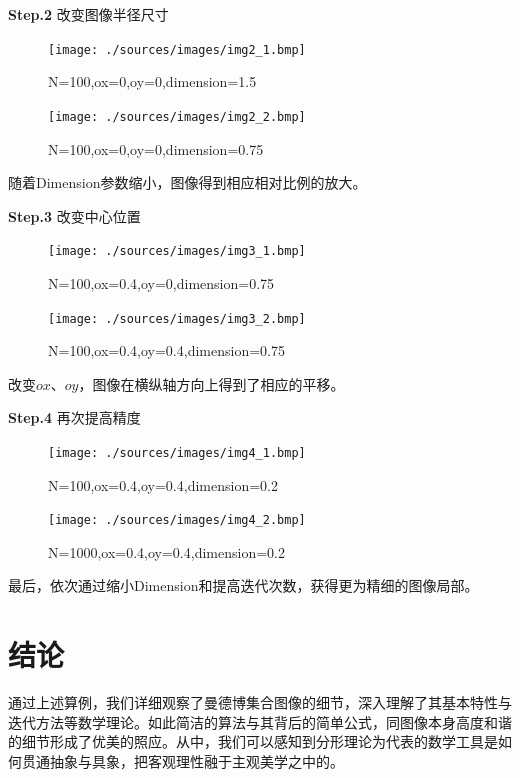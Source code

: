 \documentclass{ctexart}
\begin{document}
\textbf{Step.2} 改变图像半径尺寸

\begin{figure}[htb]
\centering
\begin{minipage}{0.48\linewidth}
\centering
\texttt{[image: ./sources/images/img2\_1.bmp]}
\caption{N=100,ox=0,oy=0,dimension=1.5}
\end{minipage}\hfill
\begin{minipage}{0.48\linewidth}
\centering
\texttt{[image: ./sources/images/img2\_2.bmp]}
\caption{N=100,ox=0,oy=0,dimension=0.75}
\end{minipage}
\end{figure}

随着Dimension参数缩小，图像得到相应相对比例的放大。

\textbf{Step.3} 改变中心位置

\begin{figure}[htb]
\centering
\begin{minipage}{0.48\linewidth}
\centering
\texttt{[image: ./sources/images/img3\_1.bmp]}
\caption{N=100,ox=0.4,oy=0,dimension=0.75}
\end{minipage}\hfill
\begin{minipage}{0.48\linewidth}
\centering
\texttt{[image: ./sources/images/img3\_2.bmp]}
\caption{N=100,ox=0.4,oy=0.4,dimension=0.75}
\end{minipage}
\end{figure}

改变$ox$、$oy$，图像在横纵轴方向上得到了相应的平移。

\textbf{Step.4} 再次提高精度

\begin{figure}[htb]
\centering
\begin{minipage}{0.48\linewidth}
\centering
\texttt{[image: ./sources/images/img4\_1.bmp]}
\caption{N=100,ox=0.4,oy=0.4,dimension=0.2}
\end{minipage}\hfill
\begin{minipage}{0.48\linewidth}
\centering
\texttt{[image: ./sources/images/img4\_2.bmp]}
\caption{N=1000,ox=0.4,oy=0.4,dimension=0.2}
\end{minipage}
\end{figure}

最后，依次通过缩小Dimension和提高迭代次数，获得更为精细的图像局部。

\section{结论}

通过上述算例，我们详细观察了曼德博集合图像的细节，深入理解了其基本特性与迭代方法等数学理论。如此简洁的算法与其背后的简单公式，同图像本身高度和谐的细节形成了优美的照应。从中，我们可以感知到分形理论为代表的数学工具是如何贯通抽象与具象，把客观理性融于主观美学之中的。



\end{document}
